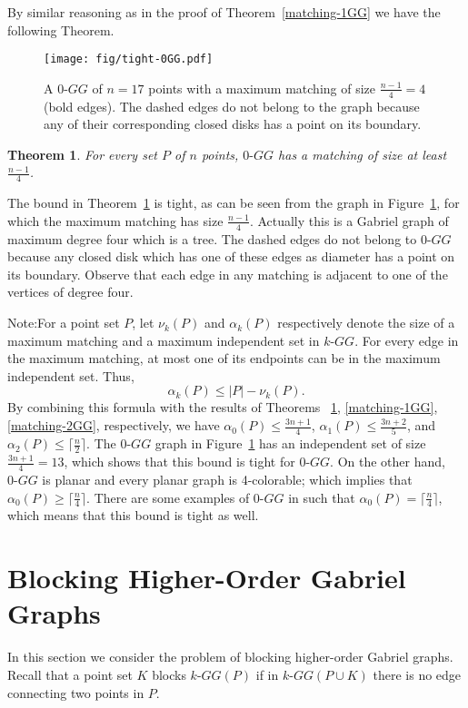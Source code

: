 \documentclass[11pt,a4paper]{article}
\newcommand{\kGG}[2]{$#1\text{-}GG#2$}
\newtheorem{theorem}{Theorem}
\begin{document}
By similar reasoning as in the proof of Theorem~\ref{matching-1GG} we have the following Theorem.

\begin{figure}[htb]
  \centering
  \texttt{[image: fig/tight-0GG.pdf]}
 \caption{A \kGG{0}{} of  $n = 17$ points with a maximum matching of size $\frac{n-1}{4}=4$ (bold edges). The dashed edges do not belong to the graph because any of their corresponding closed disks has a point on its boundary.}
  \label{tight-0GG}
\end{figure}

\begin{theorem}
\label{matching-0GG}
For every set $P$ of $n$ points, \kGG{0}{} has a matching of size at least $\frac{n-1}{4}$.
\end{theorem}

The bound in Theorem~\ref{matching-0GG} is tight, as can be seen from the graph in Figure~\ref{tight-0GG}, for which the maximum matching has size $\frac{n-1}{4}$. Actually this is a Gabriel graph of maximum degree four which is a tree. The dashed edges do not belong to \kGG{0}{} because any closed disk which has one of these edges as diameter has a point on its boundary. Observe that each edge in any matching is adjacent to one of the vertices of degree four.

\begin{paragraph}{Note:}For a point set $P$, let $\nu_k(P)$ and $\alpha_k(P)$ respectively denote the size of a maximum matching and a maximum independent set in \kGG{k}{}. For every edge in the maximum matching, at most one of its endpoints can be in the maximum independent set. Thus,$$\alpha_k(P)\le |P| - \nu_k(P).$$
By combining this formula with the results of Theorems ~\ref{matching-0GG}, \ref{matching-1GG}, \ref{matching-2GG}, respectively, we have $\alpha_0(P)\le \frac{3n+1}{4}$, $\alpha_1(P)\le \frac{3n+2}{5}$, and $\alpha_2(P)\le \lceil\frac{n}{2}\rceil$. The \kGG{0}{} graph in Figure~\ref{tight-0GG} has an independent set of size $\frac{3n+1}{4}=13$, which shows that this bound is tight for \kGG{0}{}. On the other hand, \kGG{0}{} is planar and every planar graph is 4-colorable; which implies that $\alpha_0(P)\ge \lceil\frac{n}{4}\rceil$. There are some examples of \kGG{0}{} in \cite{Matula1980} such that $\alpha_0(P)= \lceil\frac{n}{4}\rceil$, which means that this bound is tight as well.
\end{paragraph}

\section{Blocking Higher-Order Gabriel Graphs}
\label{blocking-section}
In this section we consider the problem of blocking higher-order Gabriel graphs. Recall that a point set $K$ blocks \kGG{k}{(P)} if in \kGG{k}{(P\cup K)} there is no edge connecting two points in $P$. 
\end{document}
